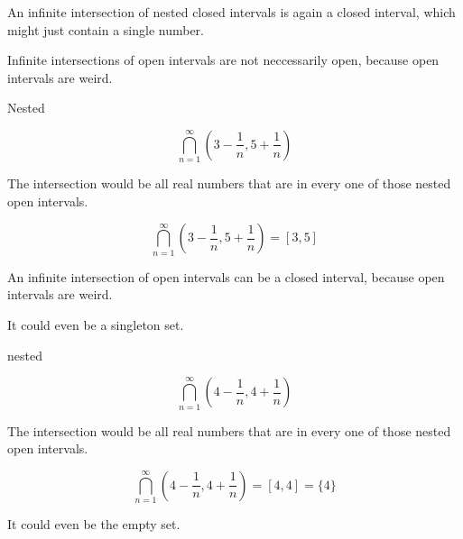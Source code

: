 \documentclass{ximera}
\begin{document}
An infinite intersection of nested closed intervals is again a closed interval, which might just contain a single number. 





Infinite intersections of open intervals are not neccessarily open, because open intervals are weird.


\begin{example} Nested


\[ \bigcap_{n=1}^{\infty}   \left(3 - \frac{1}{n}, 5 + \frac{1}{n}\right)     \]



The intersection would be all real numbers that are in every one of those nested open intervals.


\[ \bigcap_{n=1}^{\infty}   \left(3 - \frac{1}{n}, 5 + \frac{1}{n}\right)  = [3, 5]   \]





\end{example}


An infinite intersection of open intervals can be a closed interval, because open intervals are weird.


It could even be a singleton set.




\begin{example} nested


\[ \bigcap_{n=1}^{\infty}   \left(4 - \frac{1}{n}, 4 +  \frac{1}{n}\right)     \]



The intersection would be all real numbers that are in every one of those nested open intervals.


\[ \bigcap_{n=1}^{\infty}   \left(4 -  \frac{1}{n}, 4 + \frac{1}{n}\right)    = [4, 4] = \{ 4 \}   \]





\end{example}





It could even be the empty set.
\end{document}
